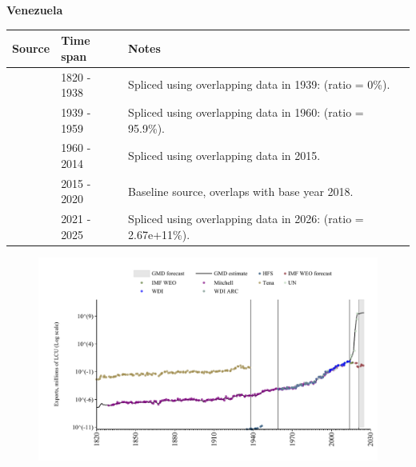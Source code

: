 \documentclass[12pt,a4paper,landscape]{article}
\begin{document}
\begin{adjustbox}{max totalsize={\paperwidth}{\paperheight},center}
\begin{minipage}[t][\textheight][t]{\textwidth}
\vspace*{0.5cm}
{}
\begin{center}
{\Large\bfseries Venezuela}
\end{center}
\vspace{0.5cm}
\begin{table}[H]
\centering
\small
\begin{tabular}{|l|l|l|}
\hline
\textbf{Source} & \textbf{Time span} & \textbf{Notes} \\
\hline
\rowcolor{white}\cite{Tena}& 1820 - 1938 &Spliced using overlapping data in 1939: (ratio = 0\%).\\
\rowcolor{lightgray}\cite{Mitchell}& 1939 - 1959 &Spliced using overlapping data in 1960: (ratio = 95.9\%).\\
\rowcolor{white}\cite{WDI}& 1960 - 2014 &Spliced using overlapping data in 2015.\\
\rowcolor{lightgray}\cite{UN}& 2015 - 2020 &Baseline source, overlaps with base year 2018.\\
\rowcolor{white}\cite{IMF_WEO_forecast}& 2021 - 2025 &Spliced using overlapping data in 2026: (ratio = 2.67e+11\%).\\
\hline
\end{tabular}
\end{table}
\begin{figure}[H]
\centering
\includegraphics[width=\textwidth,height=0.6\textheight,keepaspectratio]{graphs/VEN_exports.pdf}
\end{figure}
\end{minipage}
\end{adjustbox}
\end{document}
